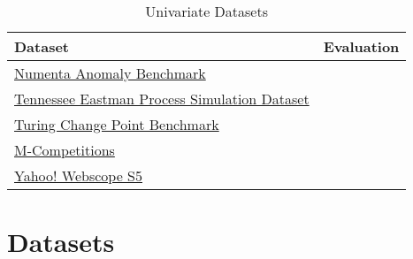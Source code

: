 

\begin{table}[h]\centering
        \begin{tabular}{ll}
            Dataset                                                                                                                             & Evaluation    \\\midrule
            \href{https://github.com/numenta/NAB}{Numenta Anomaly Benchmark}                                                                    &               \\\addlinespace
            \href{https://www.kaggle.com/averkij/tennessee-eastman-process-simulation-dataset}{Tennessee Eastman Process Simulation Dataset}    &               \\\addlinespace
            \href{https://github.com/alan-turing-institute/TCPDBench}{Turing Change Point Benchmark}                                            &               \\\addlinespace
            \href{https://en.wikipedia.org/wiki/Makridakis\_Competitions}{M-Competitions}                                                       &               \\\addlinespace
            \href{https://webscope.sandbox.yahoo.com/catalog.php?datatype=s\&did=70}{Yahoo! Webscope S5}                                        &               \\
        \end{tabular}
    \caption{Univariate Datasets}\label{tab:datasets}
\end{table}


\section{Datasets}


